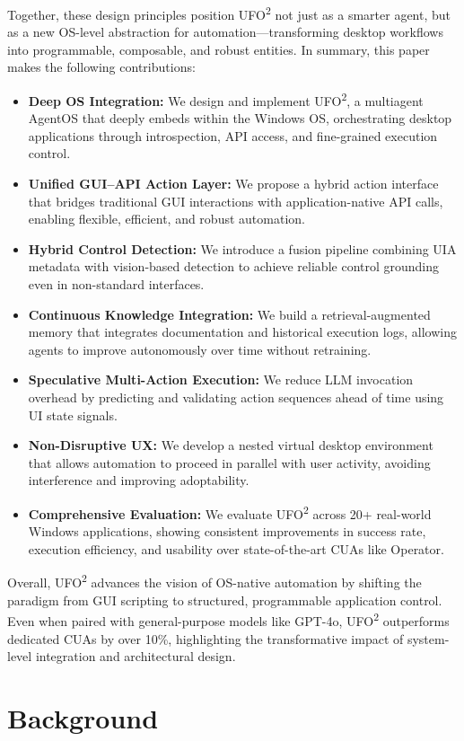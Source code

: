 \documentclass[sigplan,10pt]{acmart}
\newcommand{\name}{\textsc{UFO}\textsuperscript{2}\xspace}
\begin{document}
Together, these design principles position \name not just as a smarter agent, but as a new OS-level abstraction for automation—transforming desktop workflows into programmable, composable, and robust entities. In summary, this paper makes the following contributions:
\begin{itemize} 
    \item \textbf{Deep OS Integration:} We design and implement \name, a multiagent AgentOS that deeply embeds within the Windows OS, orchestrating desktop applications through introspection, API access, and fine-grained execution control. 
    \item \textbf{Unified GUI--API Action Layer:} We propose a hybrid action interface that bridges traditional GUI interactions with application-native API calls, enabling flexible, efficient, and robust automation.
    \item \textbf{Hybrid Control Detection:} We introduce a fusion pipeline combining UIA metadata with vision-based detection to achieve reliable control grounding even in non-standard interfaces.
    \item \textbf{Continuous Knowledge Integration:} We build a retrieval-augmented memory that integrates documentation and historical execution logs, allowing agents to improve autonomously over time without retraining.
    \item \textbf{Speculative Multi-Action Execution:} We reduce LLM invocation overhead by predicting and validating action sequences ahead of time using UI state signals.
    \item \textbf{Non-Disruptive UX:} We develop a nested virtual desktop environment that allows automation to proceed in parallel with user activity, avoiding interference and improving adoptability.
    \item \textbf{Comprehensive Evaluation:} We evaluate \name across 20+ real-world Windows applications, showing consistent improvements in success rate, execution efficiency, and usability over state-of-the-art CUAs like Operator.
\end{itemize}
Overall, \name advances the vision of OS-native automation by shifting the paradigm from GUI scripting to structured, programmable application control. Even when paired with general-purpose models like GPT-4o, \name outperforms dedicated CUAs by over 10\%, highlighting the transformative impact of system-level integration and architectural design.



\section{Background}\label{sec:background}
\end{document}

